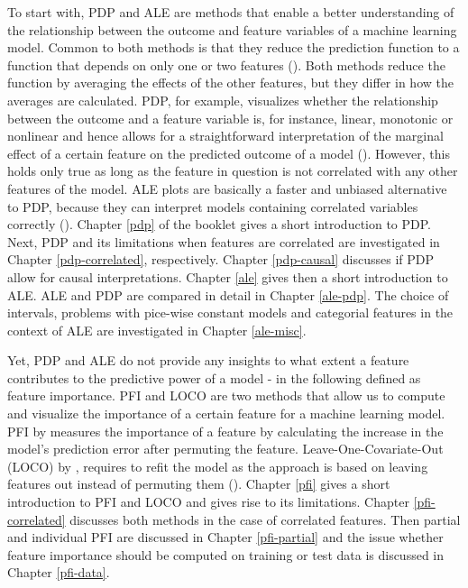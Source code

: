 \documentclass[]{krantz}
\begin{document}
To start with, PDP and ALE are methods that enable a better
understanding of the relationship between the outcome and feature
variables of a machine learning model. Common to both methods is that
they reduce the prediction function to a function that depends on only
one or two features (\citet{molnar2019}). Both methods reduce the
function by averaging the effects of the other features, but they differ
in how the averages are calculated. PDP, for example, visualizes whether
the relationship between the outcome and a feature variable is, for
instance, linear, monotonic or nonlinear and hence allows for a
straightforward interpretation of the marginal effect of a certain
feature on the predicted outcome of a model
(\citet{friedman2001greedy}). However, this holds only true as long as
the feature in question is not correlated with any other features of the
model. ALE plots are basically a faster and unbiased alternative to PDP,
because they can interpret models containing correlated variables
correctly (\citet{molnar2019}). Chapter \ref{pdp} of the booklet gives a
short introduction to PDP. Next, PDP and its limitations when features
are correlated are investigated in Chapter \ref{pdp-correlated},
respectively. Chapter \ref{pdp-causal} discusses if PDP allow for causal
interpretations. Chapter \ref{ale} gives then a short introduction to
ALE. ALE and PDP are compared in detail in Chapter \ref{ale-pdp}. The
choice of intervals, problems with pice-wise constant models and
categorial features in the context of ALE are investigated in Chapter
\ref{ale-misc}.

Yet, PDP and ALE do not provide any insights to what extent a feature
contributes to the predictive power of a model - in the following
defined as feature importance. PFI and LOCO are two methods that allow
us to compute and visualize the importance of a certain feature for a
machine learning model. PFI by \citet{breiman2001random} measures the
importance of a feature by calculating the increase in the model's
prediction error after permuting the feature. Leave-One-Covariate-Out
(LOCO) by \citet{lei2018distribution}, requires to refit the model as
the approach is based on leaving features out instead of permuting them
(\citet{casalicchio2018visualizing}). Chapter \ref{pfi} gives a short
introduction to PFI and LOCO and gives rise to its limitations. Chapter
\ref{pfi-correlated} discusses both methods in the case of correlated
features. Then partial and individual PFI are discussed in Chapter
\ref{pfi-partial} and the issue whether feature importance should be
computed on training or test data is discussed in Chapter
\ref{pfi-data}.
\end{document}
